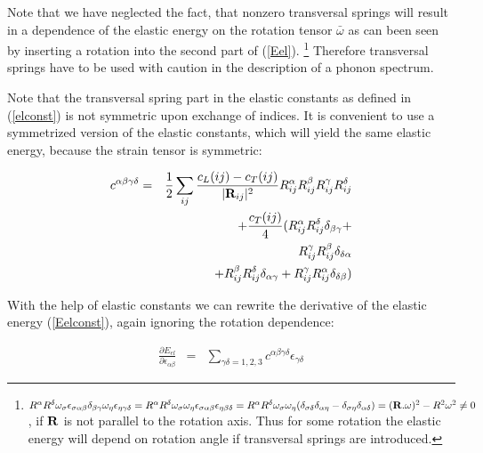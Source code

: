 Note that we have neglected the fact, that nonzero transversal springs will 
result in a dependence of the elastic energy on the rotation tensor $\bar \omega$ as
can been seen by inserting a rotation into the second part of (\ref{Eel}).
\footnote{$R^{\alpha}R^{\delta}\omega_{\sigma}
\epsilon_{\sigma\alpha\beta}\delta_{\beta\gamma}\omega_{\eta}\epsilon_{\eta\gamma\delta}=
R^{\alpha}R^{\delta}\omega_{\sigma} \omega_{\eta}
\epsilon_{\sigma\alpha\beta}\epsilon_{\eta\beta\delta}=
R^{\alpha}R^{\delta}\omega_{\sigma} \omega_{\eta}
(\delta_{\sigma\delta}\delta_{\alpha\eta}-\delta_{\sigma\eta}\delta_{\alpha\delta})=
(\mathbf R . \mathbf \omega)^2-R^2\omega^2 \neq 0$,
if $\mathbf R$ is not parallel to the rotation axis. Thus for some rotation the elastic energy
will depend on rotation angle if transversal springs are  introduced.
}
Therefore transversal springs have to be used with caution
 in the description of a phonon spectrum.

Note that the transversal spring part in the elastic constants as defined in (\ref{elconst}) 
is not symmetric upon exchange of indices. It is convenient to use a symmetrized version
of the elastic constants, which will yield the same elastic energy, because the
strain tensor is symmetric:

\begin{eqnarray}\label{elconstsymm}
c^{\alpha\beta\gamma\delta} &= &
 \frac{1}{2}\sum_{ij}\frac{c_L(ij)-c_T(ij)}{|\mathbf R_{ij}|^2} 
R_{ij}^{\alpha}R_{ij}^{\beta}R_{ij}^{\gamma}R_{ij}^{\delta}
 \nonumber \\
&& +    \frac{c_T(ij)}{4} ( R_{ij}^{\alpha}R_{ij}^{\delta}
 \delta_{\beta\gamma}  + \nonumber \\
&&  R_{ij}^{\gamma} R_{ij}^{\beta}
 \delta_{\delta\alpha}  \nonumber \\
&& +    R_{ij}^{\beta}R_{ij}^{\delta}
 \delta_{\alpha\gamma}  +   R_{ij}^{\gamma}R_{ij}^{\alpha}
 \delta_{\delta\beta} ) \nonumber \\
\end{eqnarray}



With the help of elastic constants we can rewrite the derivative of the elastic energy
(\ref{Eelconst}), again ignoring the rotation dependence:

\begin{eqnarray}\label{Eelderivelconst}
\frac{\partial E_{el}}{\partial \epsilon_{\alpha\beta}}&=&
\sum_{\gamma\delta=1,2,3} c^{\alpha\beta\gamma\delta} \epsilon_{\gamma\delta}
\end{eqnarray}




